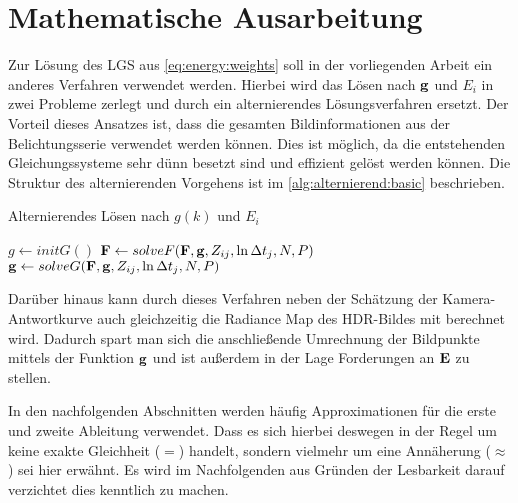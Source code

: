 \chapter{Mathematische Ausarbeitung}
\label{chap:maths}
Zur Lösung des \gls{LGS} aus \autoref{eq:energy:weights} soll in der vorliegenden Arbeit ein anderes Verfahren verwendet werden. Hierbei wird das Lösen nach $\b g$ und $E_i$ in zwei Probleme zerlegt und durch ein alternierendes Lösungsverfahren ersetzt. Der Vorteil dieses Ansatzes ist, dass die gesamten Bildinformationen aus der Belichtungsserie verwendet werden können. Dies ist möglich, da die entstehenden Gleichungssysteme sehr dünn besetzt sind und effizient gelöst werden können. Die Struktur des alternierenden Vorgehens ist im \autoref{alg:alternierend:basic} beschrieben.

\begin{Algorithmus} %
\caption{Alternierendes Lösen nach $g(k)$ und $E_i$}
\label{alg:alternierend:basic}
\begin{algorithmic}
	\State $g \gets initG()$
		\State $\mathbf F \gets solveF(\mathbf F, \mathbf g, Z_{ij}, \ln \Delta t_j, N, P)$ 
		\State $\mathbf g \gets solveG(\mathbf F, \mathbf g, Z_{ij}, \ln \Delta t_j, N, P)$
	\EndWhile
	\State \Return [$\b g$, $\b F$]
\EndFunction
\end{algorithmic}
\end{Algorithmus}

Darüber hinaus kann durch dieses Verfahren neben der Schätzung der Kamera-Antwortkurve auch gleichzeitig die \gls{Radiance Map} des \gls{HDR}-Bildes mit berechnet wird. Dadurch spart man sich die anschließende Umrechnung der Bildpunkte mittels der Funktion $\b g$ und ist außerdem in der Lage Forderungen an $\mathbf E$ zu stellen.

In den nachfolgenden Abschnitten werden häufig Approximationen für die erste und zweite Ableitung verwendet. Dass es sich hierbei deswegen in der Regel um keine exakte Gleichheit ($=$) handelt, sondern vielmehr um eine Annäherung ($\approx$) sei hier erwähnt. Es wird im Nachfolgenden aus Gründen der Lesbarkeit darauf verzichtet dies kenntlich zu machen.


